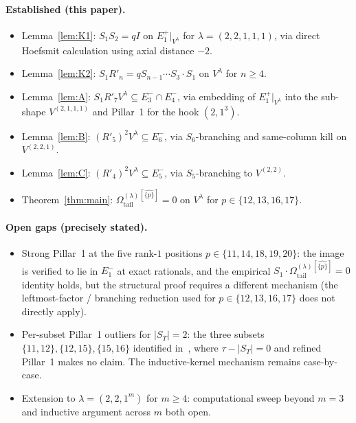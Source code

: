 \documentclass[11pt]{article}
\theoremstyle{definition}
\newcommand{\Vlam}{V^\lambda}
\newcommand{\Omtail}{\Omega^{(\lambda)}_{\mathrm{tail}}}
\newcommand{\Rp}{R'}
\newcommand{\Eplus}[1]{E^+_{#1}}
\newcommand{\Eminus}[1]{E^-_{#1}}
\begin{document}
\paragraph{Established (this paper).}
\begin{itemize}[topsep=0.2em,itemsep=0.1em]
\item Lemma~\ref{lem:K1}: $S_1 S_2 = q I$ on $\Eplus 1|_{\Vlam}$ for
   $\lambda = (2,2,1,1,1)$, via direct Hoefsmit calculation using axial distance $-2$.
\item Lemma~\ref{lem:K2}: $S_1 \Rp_n = q S_{n-1} \cdots S_3 \cdot S_1$ on $\Vlam$
   for $n \ge 4$.
\item Lemma~\ref{lem:A}: $S_1 \Rp_7 \Vlam \subseteq \Eminus 3 \cap \Eminus 4$, via
   embedding of $\Eplus 1|_{\Vlam}$ into the sub-shape $V^{(2,1,1,1)}$ and Pillar~1
   for the hook $(2,1^3)$.
\item Lemma~\ref{lem:B}: $(\Rp_5)^2 \Vlam \subseteq \Eminus 6$, via $S_6$-branching
   and same-column kill on $V^{(2,2,1)}$.
\item Lemma~\ref{lem:C}: $(\Rp_4)^2 \Vlam \subseteq \Eminus 5$, via $S_5$-branching
   to $V^{(2,2)}$.
\item Theorem~\ref{thm:main}: $\Omtail^{[\widehat{\{p\}}]} = 0$ on $\Vlam$ for
   $p \in \{12, 13, 16, 17\}$.
\end{itemize}

\paragraph{Open gaps (precisely stated).}
\begin{itemize}[topsep=0.2em,itemsep=0.1em]
\item Strong Pillar~1 at the five rank-$1$ positions $p \in \{11, 14, 18, 19, 20\}$:
   the image is verified to lie in $\Eminus 1$ at exact rationals, and the empirical
   $S_1 \cdot \Omtail^{[\widehat{\{p\}}]} = 0$ identity holds, but the structural
   proof requires a different mechanism (the leftmost-factor / branching reduction
   used for $p \in \{12, 13, 16, 17\}$ does not directly apply).
\item Per-subset Pillar~1 outliers for $|S_T| = 2$: the three subsets
   $\{11, 12\}, \{12, 15\}, \{15, 16\}$ identified
   in~\cite{strong,persubset}, where $\tau - |S_T| = 0$ and refined Pillar~1
   makes no claim. The inductive-kernel mechanism remains case-by-case.
\item Extension to $\lambda = (2, 2, 1^m)$ for $m \ge 4$: computational sweep
   beyond $m = 3$ and inductive argument across $m$ both open.
\end{itemize}
\end{document}
